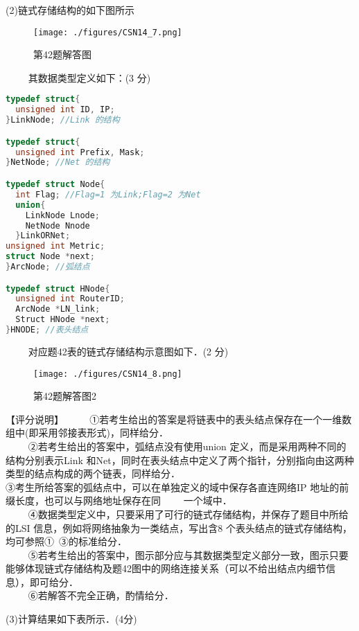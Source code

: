 (2)链式存储结构的如下图所示
\begin{figure}[ht]
\centering
\texttt{[image: ./figures/CSN14\_7.png]}
\caption{第42题解答图} \label{CSN14_fig7}
\end{figure}
$\qquad$ 其数据类型定义如下：(3 分) \\
\begin{lstlisting}[language=cpp]
typedef struct{
  unsigned int ID, IP;
}LinkNode; //Link 的结构

typedef struct{
  unsigned int Prefix, Mask;
}NetNode; //Net 的结构

typedef struct Node{
  int Flag; //Flag=1 为Link;Flag=2 为Net
  union{
    LinkNode Lnode;
    NetNode Nnode
  }LinkORNet;
unsigned int Metric;
struct Node *next;
}ArcNode; //弧结点

typedef struct HNode{
  unsigned int RouterID;
  ArcNode *LN_link;
  Struct HNode *next;
}HNODE; //表头结点
\end{lstlisting}
$\qquad$ 对应题42表的链式存储结构示意图如下．(2 分)
\begin{figure}[ht]
\centering
\texttt{[image: ./figures/CSN14\_8.png]}
\caption{第42题解答图2} \label{CSN14_fig8}
\end{figure}
【评分说明】
$\qquad$ ①若考生给出的答案是将链表中的表头结点保存在一个一维数组中(即采用邻接表形式)，同样给分．  \\
$\qquad$ ②若考生给出的答案中，弧结点没有使用union 定义，而是采用两种不同的结构分别表示Link 和Net，同时在表头结点中定义了两个指针，分别指向由这两种类型的结点构成的两个链表，同样给分． \\
③考生所给答案的弧结点中，可以在单独定义的域中保存各直连网络IP 地址的前缀长度，也可以与网络地址保存在同$\qquad$ 一个域中． \\
$\qquad$ ④数据类型定义中，只要采用了可行的链式存储结构，并保存了题目中所给的LSI 信息，例如将网络抽象为一类结点，写出含8 个表头结点的链式存储结构，均可参照①~③的标准给分． \\
$\qquad$ ⑤若考生给出的答案中，图示部分应与其数据类型定义部分一致，图示只要能够体现链式存储结构及题42图中的网络连接关系（可以不给出结点内细节信息），即可给分． \\
$\qquad$ ⑥若解答不完全正确，酌情给分．

(3)计算结果如下表所示．(4分) \\

